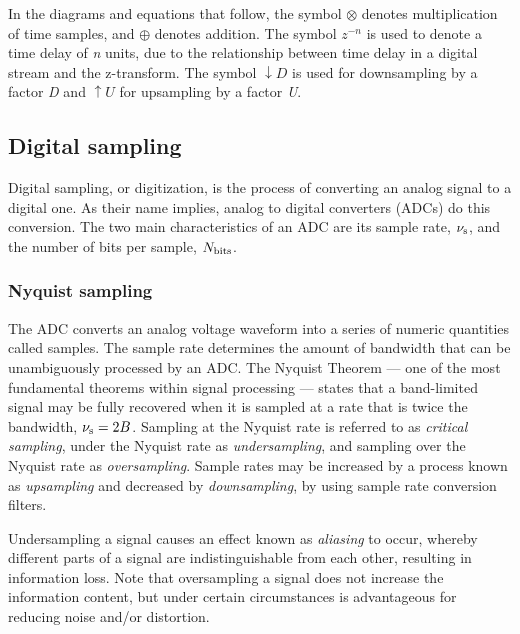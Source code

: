 \documentclass{ws-rv961x669}
\begin{document}
In the diagrams and equations that follow, the symbol $\otimes$ denotes multiplication of time samples, and $\oplus$ denotes addition. The symbol $z^{-n}$ is used to denote a time delay of \emph{n} units, due to the relationship between time delay in a digital stream and the z-transform. The symbol $\downarrow D$ is used for downsampling by a factor \emph{D} and $\uparrow U$ for upsampling by a factor \emph{U}.

\subsection{Digital sampling}

Digital sampling, or digitization, is the process of converting an analog signal to a digital one. As their name implies, analog to digital converters (ADCs) do this conversion. The two main characteristics of an ADC are its sample rate, $\nu_{\rm{s}}$, and the number of bits per sample, $N_{\rm{bits}}$.

\subsubsection{Nyquist sampling \label{sub:sampling}}

The ADC converts an analog voltage waveform into a series of numeric quantities called samples. The sample rate determines the amount of bandwidth that can be unambiguously processed by an ADC. The Nyquist Theorem --- one of the most fundamental theorems within signal processing --- states that a band-limited signal may be fully recovered when it is sampled at a rate that is twice the bandwidth, $\nu_{\rm{s}} = 2 B$. 
Sampling at the  Nyquist rate is referred to as \emph{critical sampling}, under the Nyquist rate as \emph{undersampling}, and sampling over the Nyquist rate as \emph{oversampling}. Sample rates may be increased by a process known as \emph{upsampling} and decreased by \emph{downsampling}, by using sample rate conversion filters.

Undersampling a signal causes an effect known as \emph{aliasing} to occur, whereby different parts of a signal are indistinguishable from each other, resulting in information loss. Note that oversampling a signal does not increase the information content, but under certain circumstances is advantageous for reducing noise and/or distortion.
\end{document}
